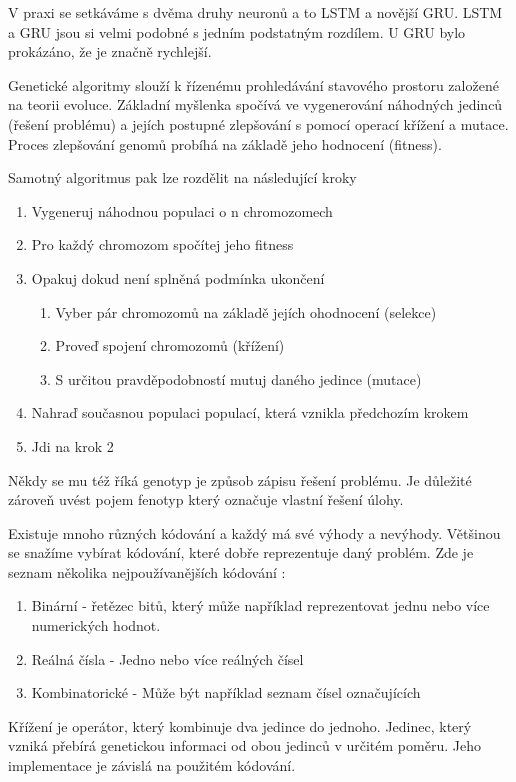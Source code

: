 V praxi se setkáváme s dvěma druhy neuronů a to LSTM a novější GRU. LSTM a GRU jsou si velmi podobné s jedním podstatným rozdílem. U GRU bylo prokázáno, že je značně rychlejší. 


Genetické algoritmy slouží k řízenému prohledávání stavového prostoru založené na teorii evoluce. \cite[s.~17]{kozaGP}
Základní myšlenka spočívá ve vygenerování náhodných jedinců (řešení problému) a jejích postupné zlepšování s pomocí operací křížení a mutace. Proces zlepšování genomů probíhá na základě jeho hodnocení (fitness).

Samotný algoritmus pak lze rozdělit na následující kroky \cite[s.~12]{geneticAlgorithms}

\begin{enumerate}
	\item Vygeneruj náhodnou populaci o n chromozomech
	\item Pro každý chromozom spočítej jeho fitness
	\item Opakuj dokud není splněná podmínka ukončení
	\begin{enumerate}
		\item Vyber pár chromozomů na základě jejích ohodnocení (selekce)
		\item Proveď spojení chromozomů (křížení)
		\item S určitou pravděpodobností mutuj daného jedince (mutace)
	\end{enumerate}
	\item Nahraď současnou populaci populací, která vznikla předchozím krokem
	\item Jdi na krok 2
\end{enumerate}

Někdy se mu též říká genotyp je způsob zápisu řešení problému. Je důležité zároveň uvést pojem fenotyp který označuje vlastní řešení úlohy.

Existuje mnoho různých kódování a každý má své výhody a nevýhody. Většinou se snažíme vybírat kódování, které dobře reprezentuje daný problém. Zde je seznam několika nejpoužívanějších kódování \cite[s.~42-43]{geneticCZ}:
\begin{enumerate}
	\item Binární - řetězec bitů, který může například reprezentovat jednu nebo více numerických hodnot. 
	\item Reálná čísla - Jedno nebo více reálných čísel
	\item Kombinatorické - Může být například seznam čísel označujících 
\end{enumerate}
Křížení je operátor, který kombinuje dva jedince do jednoho. Jedinec, který vzniká přebírá genetickou informaci od obou jedinců v určitém poměru. Jeho implementace je závislá na použitém kódování. 

